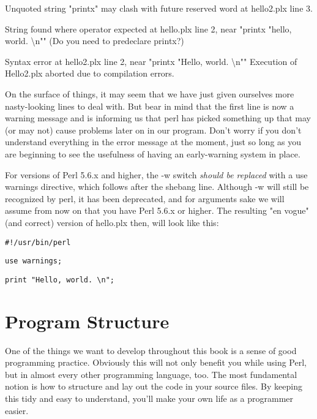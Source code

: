 \documentclass[a4paper,11pt]{book}
\begin{document}
\noindent Unquoted string "printx" may clash with future reserved word at hello2.plx line 3.

\noindent String found where operator expected at hello.plx line 2, near "printx "hello, world. \textbackslash n"" (Do you need to predeclare printx?)

\noindent Syntax error at hello2.plx line 2, near "printx "Hello, world. \textbackslash n"" Execution of Hello2.plx aborted due to compilation errors.

\noindent

\noindent On the surface of things, it may seem that we have just given ourselves more nasty-looking lines to deal with. But bear in mind that the first line is now a warning message and is informing us that perl has picked something up that may (or may not) cause problems later on in our program. Don't worry if you don't understand everything in the error message at the moment, just so long as you are beginning to see the usefulness of having an early-warning system in place.

\noindent 

\noindent For versions of Perl 5.6.x and higher, the -w switch \textit{should be replaced }with a use warnings directive, which follows after the shebang line. Although -w will still be recognized by perl, it has been deprecated, and for arguments sake we will assume from now on that you have Perl 5.6.x or higher. The resulting "en vogue" (and correct) version of hello.plx then, will look like this:

\noindent 

\noindent \texttt{\#!/usr/bin/perl}

\noindent \texttt{use warnings;}

\noindent 

\noindent \texttt{print "Hello, world. \textbackslash n";}

\noindent 

\section{Program Structure}

\noindent 

\noindent One of the things we want to develop throughout this book is a sense of good programming practice. Obviously this will not only benefit you while using Perl, but in almost every other programming language, too. The most fundamental notion is how to structure and lay out the code in your source files. By keeping this tidy and easy to understand, you'll make your own life as a programmer easier.
\end{document}
